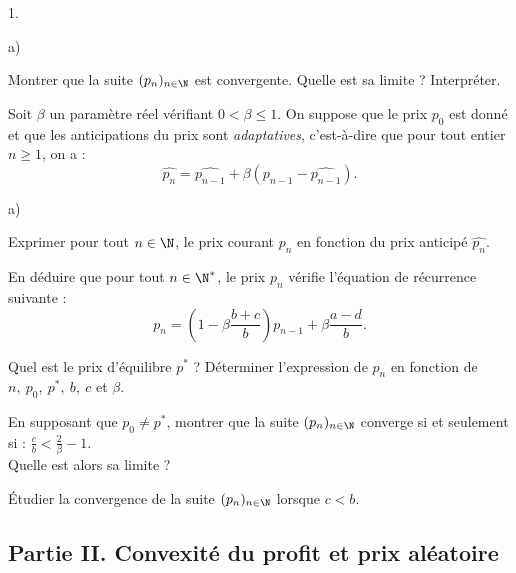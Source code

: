 \documentclass[11pt]{article}%
\begin{document}
\begin{noliste}{1.}
\begin{noliste}{a)}
\item Montrer que la suite $(p_{n})_{n \in \N}$ est convergente. Quelle
est sa limite ? Interpréter. \\

\end{noliste}

\item Soit $\beta$ un paramètre réel vérifiant $0 < \beta \leq 1$. On
suppose que le prix $p_{0}$ est donné et que les anticipations du prix
sont \textit{adaptatives}, c'est-à-dire que pour tout entier $n \geq
1$, on a : \\
\[
\widehat{p_{n}} = \widehat{p_{n-1} } + \beta ( p_{n-1} -
\widehat{p_{n-1} } ).
\]

\begin{noliste}{a)}
 \setlength{\itemsep}{2mm}

\item Exprimer pour tout $n \in \N$, le prix courant $p_{n}$ en
fonction du prix anticipé $\widehat{p_{n}}$. \\

\item En déduire que pour tout $n \in \N^{\ast}$, le prix $p_{n}$
vérifie l'équation de récurrence suivante : 
\[
p_{n} = \left( 1 - \beta \frac{b + c}{b} \right) p_{n-1} + \beta
\frac{a-d}{b}. 
\]

\item Quel est le prix d'équilibre $p^{\ast}$ ? Déterminer l'expression
de $p_{n}$ en fonction de $n,\ p_{0},\ p^{\ast},\ b,\ c$ et $\beta$. \\

\item En supposant que $p_{0} \neq p^{\ast}$, montrer que la suite
$(p_{n})_{n \in \N}$ converge si et seulement si : $\frac{c}{b} <
\frac{2}{\beta} - 1$. \\
Quelle est alors sa limite ? \\

\item Étudier la convergence de la suite $(p_{n})_{n \in \N}$ lorsque
$c < b$. \\

\end{noliste}

\end{noliste}

\subsection*{Partie II. Convexité du profit et prix aléatoire}
\end{document}
